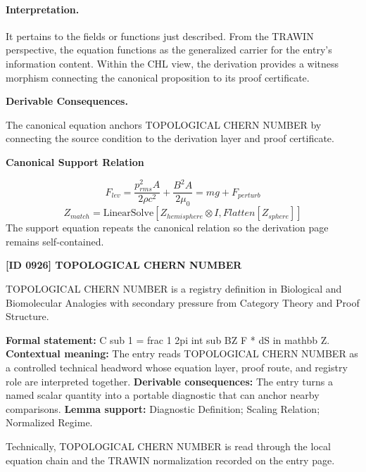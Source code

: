 \paragraph{Interpretation.}
It pertains to the fields or functions just described. From the TRAWIN perspective, the equation functions as the generalized carrier for the entry’s information content. Within the CHL view, the derivation provides a witness morphism connecting the canonical proposition to its proof certificate.

\par\vspace{0.35em}
\noindent\textbf{Derivable Consequences.}\quad
\begingroup
\footnotesize
\raggedright
The canonical equation anchors TOPOLOGICAL CHERN NUMBER by connecting the source condition to the derivation layer and proof certificate.
\par\endgroup

\noindent\textbf{Canonical Support Relation}\par
\[
F_{lev} = \frac{p_{rms}^2 A}{2 \rho c^2} + \frac{B^2 A}{2 \mu_0} = mg + F_{perturb}
\]
\[
Z_{match} = \text{LinearSolve}[Z_{hemisphere} \otimes I, Flatten[Z_{sphere}]]
\]
\noindent The support equation repeats the canonical relation so the derivation page remains self-contained.\par

\clearpage
\noindent\textbf{[ID 0926] TOPOLOGICAL CHERN NUMBER}\par
\vspace{0.35em}
\begingroup\small
{}
TOPOLOGICAL CHERN NUMBER is a registry definition in Biological and Biomolecular Analogies with secondary pressure from Category Theory and Proof Structure.

\begingroup\footnotesize\setlength{\emergencystretch}{3em}\sloppy
\textbf{Formal statement:} C sub 1 = frac 1 2pi int sub BZ F * dS in mathbb Z. \textbf{Contextual meaning:} The entry reads TOPOLOGICAL CHERN NUMBER as a controlled technical headword whose equation layer, proof route, and registry role are interpreted together. \textbf{Derivable consequences:} The entry turns a named scalar quantity into a portable diagnostic that can anchor nearby comparisons. \textbf{Lemma support:} Diagnostic Definition; Scaling Relation; Normalized Regime.\par
\endgroup

Technically, TOPOLOGICAL CHERN NUMBER is read through the local equation chain and the TRAWIN normalization recorded on the entry page.

